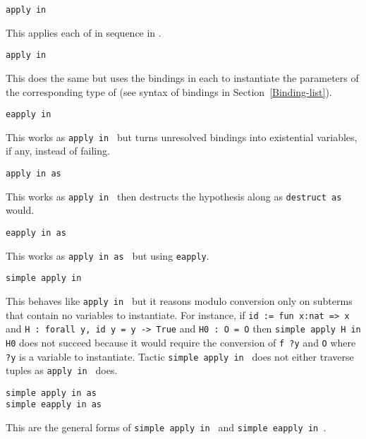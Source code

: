 \begin{Variants}
\item {\tt apply \nelist{\term}{,} in {\ident}}

This applies each of {\term} in sequence in {\ident}.

\item {\tt apply \nelist{{\term} {\bindinglist}}{,} in {\ident}}

This does the same but uses the bindings in each {\bindinglist} to 
instantiate the parameters of the corresponding type of {\term}
(see syntax of bindings in Section~\ref{Binding-list}).

\item {\tt eapply \nelist{{\term} {\bindinglist}}{,} in {\ident}}

This works as {\tt apply \nelist{{\term} {\bindinglist}}{,} in
{\ident}} but turns unresolved bindings into existential variables, if
any, instead of failing.

\item {\tt apply \nelist{{\term}{,} {\bindinglist}}{,} in {\ident} as {\disjconjintropattern}}

This works as {\tt apply \nelist{{\term}{,} {\bindinglist}}{,} in
{\ident}} then destructs the hypothesis {\ident} along
{\disjconjintropattern} as {\tt destruct {\ident} as
{\disjconjintropattern}} would.

\item {\tt eapply \nelist{{\term}{,} {\bindinglist}}{,} in {\ident} as {\disjconjintropattern}}

This works as {\tt apply \nelist{{\term}{,} {\bindinglist}}{,} in {\ident} as {\disjconjintropattern}} but using {\tt eapply}.

\item {\tt simple apply {\term} in {\ident}}

This behaves like {\tt apply {\term} in {\ident}} but it reasons
modulo conversion only on subterms that contain no variables to
instantiate. For instance, if {\tt id := fun x:nat => x} and {\tt H :
  forall y, id y = y -> True} and {\tt H0 : O = O} then {\tt simple
  apply H in H0} does not succeed because it would require the
conversion of {\tt f ?y} and {\tt O} where {\tt ?y} is a variable to
instantiate.  Tactic {\tt simple apply {\term} in {\ident}} does not
either traverse tuples as {\tt apply {\term} in {\ident}} does.

\item {\tt simple apply \nelist{{\term}{,} {\bindinglist}}{,} in {\ident} as {\disjconjintropattern}}\\
{\tt simple eapply \nelist{{\term}{,} {\bindinglist}}{,} in {\ident} as {\disjconjintropattern}}

This are the general forms of {\tt simple apply {\term} in {\ident}} and 
{\tt simple eapply {\term} in {\ident}}.
\end{Variants}

